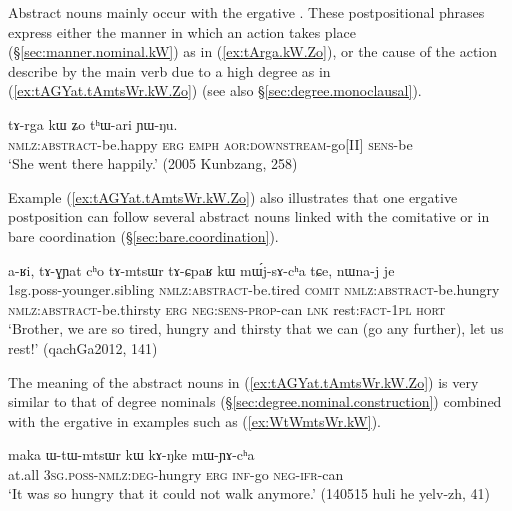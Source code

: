 Abstract nouns mainly occur with the ergative . These postpositional phrases express either the manner in which an action takes place (§\ref{sec:manner.nominal.kW}) as in (\ref{ex:tArga.kW.Zo}), or the cause of the action describe by the main verb due to a high degree as in (\ref{ex:tAGYat.tAmtsWr.kW.Zo}) (see also §\ref{sec:degree.monoclausal}). 


\begin{exe}
\ex \label{ex:tArga.kW.Zo}
\gll  tɤ-rga kɯ ʑo tʰɯ-ari ɲɯ-ŋu. \\
\textsc{nmlz}:\textsc{abstract}-be.happy \textsc{erg} \textsc{emph} \textsc{aor}:\textsc{downstream}-go[II] \textsc{sens}-be \\
\glt  `She went there happily.' (2005 Kunbzang, 258)
\end{exe}

Example (\ref{ex:tAGYat.tAmtsWr.kW.Zo}) also illustrates that one ergative postposition can follow several abstract nouns linked with the comitative  or in bare coordination (§\ref{sec:bare.coordination}). 

\begin{exe}
\ex \label{ex:tAGYat.tAmtsWr.kW.Zo}
\gll  a-ʁi, tɤ-ɣɲat cʰo tɤ-mtsɯr tɤ-ɕpaʁ kɯ mɯ́j-sɤ-cʰa tɕe, nɯna-j je \\
1sg.poss-younger.sibling \textsc{nmlz}:\textsc{abstract}-be.tired \textsc{comit} \textsc{nmlz}:\textsc{abstract}-be.hungry \textsc{nmlz}:\textsc{abstract}-be.thirsty \textsc{erg} \textsc{neg}:\textsc{sens}-\textsc{prop}-can \textsc{lnk} rest:\textsc{fact}-\textsc{1pl} \textsc{hort} \\
\glt `Brother, we are so tired, hungry and thirsty that we can (go any further), let us rest!' (qachGa2012, 141)
\end{exe}

The meaning of the abstract nouns in (\ref{ex:tAGYat.tAmtsWr.kW.Zo}) is very similar to that of degree nominals (§\ref{sec:degree.nominal.construction}) combined with the ergative in examples such as (\ref{ex:WtWmtsWr.kW}).
 
\begin{exe}
\ex \label{ex:WtWmtsWr.kW}
\gll  maka ɯ-tɯ-mtsɯr kɯ kɤ-ŋke mɯ-ɲɤ-cʰa \\
at.all \textsc{3sg}.\textsc{poss}-\textsc{nmlz}:\textsc{deg}-hungry \textsc{erg} \textsc{inf}-go \textsc{neg}-\textsc{ifr}-can \\
\glt `It was so hungry that it could not walk anymore.'  (140515 huli he yelv-zh, 41)
\end{exe}

